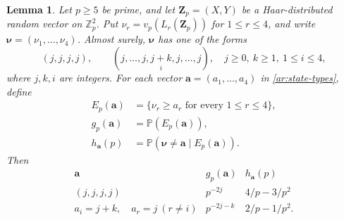 \documentclass[twoside]{aomart}
\theoremstyle{paperplain}
\newtheorem{lemma}[theorem]{Lemma}
\theoremstyle{paperdefinition}
\newcommand{\Z}{\mathbb Z}
\newcommand{\Pp}{\mathbb P}
\numberwithin{equation}{section}
\begin{document}
\begin{samepage}
\begin{lemma}
\label{ar:joint-valuation-data}
Let $p\ge5$ be prime, and let $\mathbf Z_p=(X,Y)$ be a
Haar-distributed random vector on $\Z_p^2$.
Put $\nu_r=v_p(L_r(\mathbf Z_p))$ for $1\le r\le4$, and write
$\boldsymbol\nu=(\nu_1,\ldots,\nu_4)$.
Almost surely, $\boldsymbol\nu$ has one of the forms
\begin{equation}
 (j,j,j,j),\qquad
 (j,\ldots,j,\underset{i}{j+k},j,\ldots,j),
 \quad j\ge0,\ k\ge1,\ 1\le i\le4,
 \label{ar:state-types}
\end{equation}
where $j,k,i$ are integers.
For each vector $\mathbf a=(a_1,\ldots,a_4)$ in
\eqref{ar:state-types}, define
\begin{equation*}
 \begin{aligned}
 E_p(\mathbf a)&=\{\nu_r\ge a_r\text{ for every }1\le r\le4\},\\
 g_p(\mathbf a)&=\Pp(E_p(\mathbf a)),\\
 h_{\mathbf a}(p)&=\Pp(\boldsymbol\nu\ne\mathbf a\mid E_p(\mathbf a)).
 \end{aligned}
 \end{equation*}
Then
\begin{equation}
 \begin{array}{c|c|c}
 \mathbf a&g_p(\mathbf a)&h_{\mathbf a}(p)\\\hline
 (j,j,j,j)&p^{-2j}&4/p-3/p^2\\
 a_i=j+k,\quad a_r=j\ (r\ne i)&p^{-2j-k}&2/p-1/p^2.
 \end{array}
 \label{ar:joint-valuation-table}
\end{equation}
\end{lemma}
\end{samepage}
\end{document}
